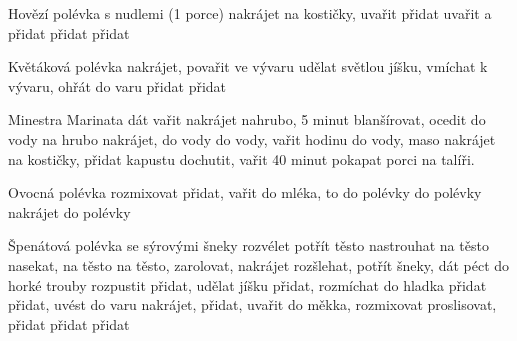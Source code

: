 \documentclass[12pt,a4paper]{article}
\begin{document}
\begin{recipe}{Hovězí polévka s nudlemi (1 porce)}
   nakrájet na kostičky, uvařit
   přidat
   uvařit a přidat
   přidat
   přidat
\end{recipe}
\newpage

\begin{recipe}{Květáková polévka}
   nakrájet, povařit ve vývaru
   udělat světlou jíšku, vmíchat k vývaru, ohřát do varu
   přidat
   přidat
\end{recipe}
\newpage

\begin{recipe}{Minestra Marinata}
   dát vařit
   nakrájet nahrubo, 5 minut blanšírovat, ocedit
   do vody
   na hrubo nakrájet, do vody
   do vody, vařit hodinu
   do vody, maso nakrájet na kostičky, přidat kapustu
   dochutit, vařit 40 minut
   pokapat porci na talíři.
\end{recipe}
\newpage

\begin{recipe}{Ovocná polévka}
   rozmixovat
   přidat, vařit
   do mléka, to do polévky
   do polévky
   nakrájet do polévky
\end{recipe}
\newpage

\begin{recipe}{Špenátová polévka se sýrovými šneky}
   rozvélet
   potřít těsto
   nastrouhat na těsto
   nasekat, na těsto
   na těsto, zarolovat, nakrájet
   rozšlehat, potřít šneky, dát péct do horké trouby
   rozpustit
   přidat, udělat jíšku
   přidat, rozmíchat do hladka
   přidat
   přidat, uvést do varu
   nakrájet, přidat, uvařit do měkka, rozmixovat
   proslisovat, přidat
   přidat
   přidat
\end{recipe}
\newpage
\end{document}
